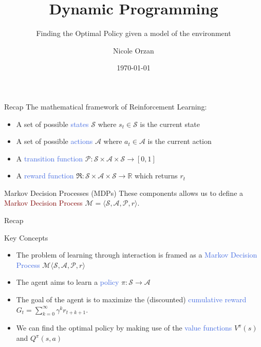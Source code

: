 \documentclass{beamer}
\title{Dynamic Programming}
\subtitle{Finding the Optimal Policy given a model of the environment}
\author{Nicole Orzan}
\date{\today}
\begin{document}
\frame{\titlepage} 


\begin{frame}{Recap}
	The mathematical framework of Reinforcement Learning:
	\begin{itemize}
		\item A set of possible \textcolor{RoyalBlue}{states} $\mathcal{S}$ where $s_t\in\mathcal{S}$ is the current state
		\item A set of possible \textcolor{RoyalBlue}{actions} $\mathcal{A}$ where $a_t\in\mathcal{A}$ is the current action
		\item A \textcolor{RoyalBlue}{transition function} $\mathcal{P}:\mathcal{S}\times\mathcal{A}\times\mathcal{S}\rightarrow[0,1]$
		\item A \textcolor{RoyalBlue}{reward function} $\Re:\mathcal{S}\times\mathcal{A}\times\mathcal{S}\rightarrow \mathbb{R}$ which returns $r_t$
	\end{itemize}

	\begin{block}{Markov Decision Processes (MDPs)}
		These components allows us to define a \textcolor{Maroon}{Markov Decision Process} 
		\centering $\mathcal{M}=\langle \mathcal{S},\mathcal{A},\mathcal{P},r\rangle$.
	\end{block}

\end{frame}


\begin{frame}{Recap}

\begin{block}{Key Concepts}
\begin{itemize}
	\item The problem of learning through interaction is framed as a \textcolor{RoyalBlue}{Markov Decision Process} $\mathcal{M}\langle \mathcal{S}, \mathcal{A}, \mathcal{P}, r \rangle$
	\item The agent aims to learn a \textcolor{RoyalBlue}{policy} $\pi: \mathcal{S}\rightarrow \mathcal{A}$
	\item The goal of the agent is to maximize the (discounted) \textcolor{RoyalBlue}{cumulative reward} $G_t = \sum_{k=0}^{\infty}\gamma^{k} r_{t+k+1}$.
	\item We can find the optimal policy by making use of the \textcolor{RoyalBlue}{value functions} $V^\pi(s)$ and $Q^\pi(s,a)$ 
\end{itemize}
\end{block}
	
\end{frame}	
\end{document}
